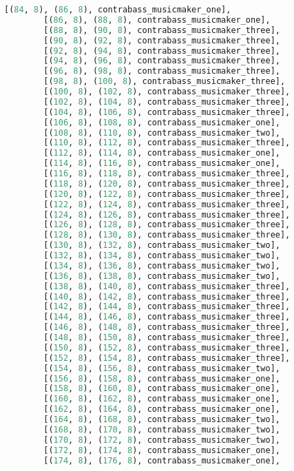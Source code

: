 \begin{lstlisting}[language=Python, caption=Invocation Source Code]
        [(84, 8), (86, 8), contrabass_musicmaker_one],
        [(86, 8), (88, 8), contrabass_musicmaker_one],
        [(88, 8), (90, 8), contrabass_musicmaker_three],
        [(90, 8), (92, 8), contrabass_musicmaker_three],
        [(92, 8), (94, 8), contrabass_musicmaker_three],
        [(94, 8), (96, 8), contrabass_musicmaker_three],
        [(96, 8), (98, 8), contrabass_musicmaker_three],
        [(98, 8), (100, 8), contrabass_musicmaker_three],
        [(100, 8), (102, 8), contrabass_musicmaker_three],
        [(102, 8), (104, 8), contrabass_musicmaker_three],
        [(104, 8), (106, 8), contrabass_musicmaker_three],
        [(106, 8), (108, 8), contrabass_musicmaker_one],
        [(108, 8), (110, 8), contrabass_musicmaker_two],
        [(110, 8), (112, 8), contrabass_musicmaker_three],
        [(112, 8), (114, 8), contrabass_musicmaker_one],
        [(114, 8), (116, 8), contrabass_musicmaker_one],
        [(116, 8), (118, 8), contrabass_musicmaker_three],
        [(118, 8), (120, 8), contrabass_musicmaker_three],
        [(120, 8), (122, 8), contrabass_musicmaker_three],
        [(122, 8), (124, 8), contrabass_musicmaker_three],
        [(124, 8), (126, 8), contrabass_musicmaker_three],
        [(126, 8), (128, 8), contrabass_musicmaker_three],
        [(128, 8), (130, 8), contrabass_musicmaker_three],
        [(130, 8), (132, 8), contrabass_musicmaker_two],
        [(132, 8), (134, 8), contrabass_musicmaker_two],
        [(134, 8), (136, 8), contrabass_musicmaker_two],
        [(136, 8), (138, 8), contrabass_musicmaker_two],
        [(138, 8), (140, 8), contrabass_musicmaker_three],
        [(140, 8), (142, 8), contrabass_musicmaker_three],
        [(142, 8), (144, 8), contrabass_musicmaker_three],
        [(144, 8), (146, 8), contrabass_musicmaker_three],
        [(146, 8), (148, 8), contrabass_musicmaker_three],
        [(148, 8), (150, 8), contrabass_musicmaker_three],
        [(150, 8), (152, 8), contrabass_musicmaker_three],
        [(152, 8), (154, 8), contrabass_musicmaker_three],
        [(154, 8), (156, 8), contrabass_musicmaker_two],
        [(156, 8), (158, 8), contrabass_musicmaker_one],
        [(158, 8), (160, 8), contrabass_musicmaker_one],
        [(160, 8), (162, 8), contrabass_musicmaker_one],
        [(162, 8), (164, 8), contrabass_musicmaker_one],
        [(164, 8), (168, 8), contrabass_musicmaker_two],
        [(168, 8), (170, 8), contrabass_musicmaker_two],
        [(170, 8), (172, 8), contrabass_musicmaker_two],
        [(172, 8), (174, 8), contrabass_musicmaker_one],
        [(174, 8), (176, 8), contrabass_musicmaker_one],

\end{lstlisting}
